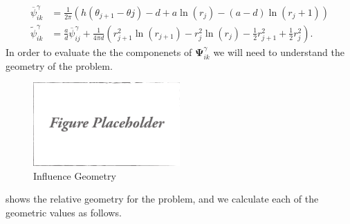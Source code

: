 \documentclass[]{article}
\begin{document}
\begin{align}
	\overline{\psi}^\gamma_{ik} &= \frac{1}{2\pi} \left( h (\theta_{j+1} - \theta{j}) - d + a \ln(r_j) - (a-d)\ln(r_j+1) \right) \\
	\widetilde{\psi}^\gamma_{ik} &= \frac{a}{d}\overline{\psi}^\gamma_{ij} + \frac{1}{4\pi d} \left(r^2_{j+1} \ln(r_{j+1}) - r^2_{j} \ln(r_j) - \frac{1}{2}r^2_{j+1} + \frac{1}{2}r^2_j \right).
\end{align}
\noindent In order to evaluate the the componenets of \(\mathbf{\Psi}^\gamma_{ik}\) we will need to understand the geometry of the problem.

\begin{figure}[h]
	\centering
	\includegraphics[width=0.5\textwidth]{draft}
	\caption{Influence Geometry}
	\label{fig:influencegeometry}
\end{figure}

 shows the relative geometry for the problem, and we calculate each of the geometric values as follows.
\end{document}
